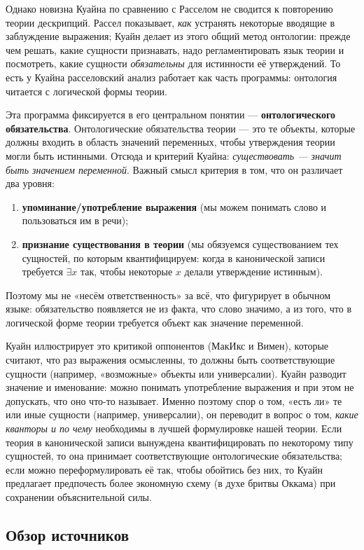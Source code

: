 \documentclass[a4paper,12pt]{article}
\begin{document}
Однако новизна Куайна по сравнению с Расселом не сводится к повторению теории дескрипций. Рассел показывает, \emph{как} устранять некоторые вводящие в заблуждение выражения; Куайн делает из этого общий метод онтологии: прежде чем решать, какие сущности признавать, надо регламентировать язык теории и посмотреть, какие сущности \emph{обязательны} для истинности её утверждений. То есть у Куайна расселовский анализ работает как часть программы: онтология читается с логической формы теории.

Эта программа фиксируется в его центральном понятии --- \textbf{онтологического обязательства}. Онтологические обязательства теории --- это те объекты, которые должны входить в область значений переменных, чтобы утверждения теории могли быть истинными. Отсюда и критерий Куайна: \emph{существовать --- значит быть значением переменной}. Важный смысл критерия в том, что он различает два уровня:
\begin{enumerate}
    \item \textbf{упоминание/употребление выражения} (мы можем понимать слово и пользоваться им в речи);
    \item \textbf{признание существования в теории} (мы обязуемся существованием тех сущностей, по которым квантифицируем: когда в канонической записи требуется $\exists x$ так, чтобы некоторые $x$ делали утверждение истинным).
\end{enumerate}
Поэтому мы не «несём ответственность» за всё, что фигурирует в обычном языке: обязательство появляется не из факта, что слово значимо, а из того, что в логической форме теории требуется объект как значение переменной.

Куайн иллюстрирует это критикой оппонентов (МакИкс и Вимен), которые считают, что раз выражения осмысленны, то должны быть соответствующие сущности (например, «возможные» объекты или универсалии). Куайн разводит значение и именование: можно понимать употребление выражения и при этом не допускать, что оно что-то называет. Именно поэтому спор о том, «есть ли» те или иные сущности (например, универсалии), он переводит в вопрос о том, \emph{какие кванторы и по чему} необходимы в лучшей формулировке нашей теории. Если теория в канонической записи вынуждена квантифицировать по некоторому типу сущностей, то она принимает соответствующие онтологические обязательства; если можно переформулировать её так, чтобы обойтись без них, то Куайн предлагает предпочесть более экономную схему (в духе бритвы Оккама) при сохранении объяснительной силы.

\subsection{Обзор источников}
\end{document}
